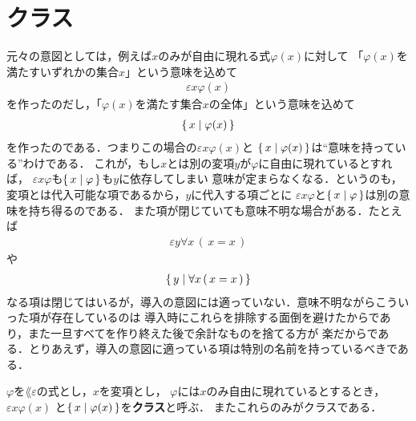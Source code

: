 \section{クラス}
	\begin{comment}
	\begin{screen}
		\begin{dfn}[閉項]
			どの変項も自由に現れない$\varepsilon$項を
			{\bf 閉${\boldsymbol \varepsilon}$項}\index{
			へいイプシロンこう@閉$\varepsilon$項}{\bf (closed epsilon term)}と呼び，
			どの変項も自由に現れない内包項を{\bf 閉内包項}\index{
			へいないほうこう@閉内包項}{\bf (closed comprehension term)}と呼ぶ．
			また閉$\varepsilon$項と閉内包項は以上のみである．
		\end{dfn}
	\end{screen}
	\end{comment}
	
	元々の意図としては，例えば$x$のみが自由に現れる式$\varphi(x)$に対して
	「$\varphi(x)$を満たすいずれかの集合$x$」という意味を込めて
	\begin{align}
		\varepsilon x \varphi(x)
	\end{align}
	を作ったのだし，「$\varphi(x)$を満たす集合$x$の全体」という意味を込めて
	\begin{align}
		\{\, x \mid \varphi(x)\, \}
	\end{align}
	を作ったのである．つまりこの場合の$\varepsilon x \varphi(x)$と
	$\{\, x \mid \varphi(x)\, \}$は``意味を持っている''わけである．
	これが，もし$x$とは別の変項$y$が$\varphi$に自由に現れているとすれば，
	$\varepsilon x \varphi$も$\{\, x \mid \varphi\, \}$も$y$に依存してしまい
	意味が定まらなくなる．というのも，変項とは代入可能な項であるから，$y$に代入する項ごとに
	$\varepsilon x \varphi$と$\{\, x \mid \varphi\, \}$は別の意味を持ち得るのである．
	また項が閉じていても意味不明な場合がある．たとえば
	\begin{align}
		\varepsilon y \forall x\, (\, x = x\, )
	\end{align}
	や
	\begin{align}
		\{\, y \mid \forall x\, (\, x = x\, )\, \}
	\end{align}
	なる項は閉じてはいるが，導入の意図には適っていない．意味不明ながらこういった項が存在しているのは
	導入時にこれらを排除する面倒を避けたからであり，また一旦すべてを作り終えた後で余計なものを捨てる方が
	楽だからである．とりあえず，導入の意図に適っている項は特別の名前を持っているべきである．
	
	\begin{screen}
		\begin{dfn}[クラス]
			$\varphi$を$\lang{\varepsilon}$の式とし，$x$を変項とし，
			$\varphi$には$x$のみ自由に現れているとするとき，$\varepsilon x \varphi(x)$
			と$\{\, x \mid \varphi(x)\, \}$を{\bf クラス}と呼ぶ．
			またこれらのみがクラスである．
		\end{dfn}
	\end{screen}
	
